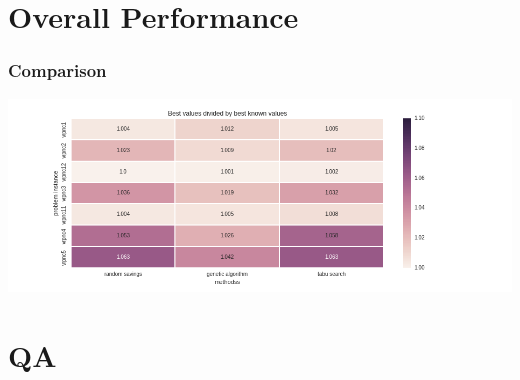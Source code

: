 \documentclass{beamer}
\begin{document}
\section{Overall Performance}

\begin{frame}
\frametitle{Comparison}
\includegraphics[scale=0.35]{figs/best_values}
\end{frame}


\section{QA}
\end{document}
